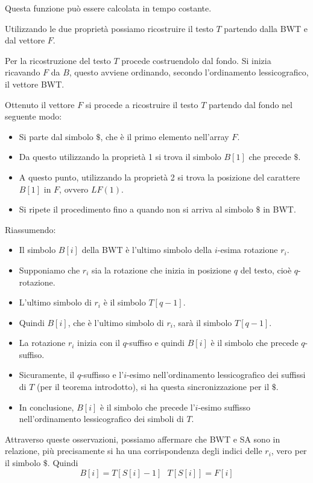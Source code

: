 Questa funzione può essere calcolata in tempo costante.

Utilizzando le due proprietà possiamo ricostruire il testo $T$ partendo dalla BWT e
dal vettore $F$.
\begin{esempio} 
    Per la ricostruzione del testo $T$ procede costruendolo dal fondo. Si inizia
    ricavando $F$ da $B$, questo avviene ordinando, secondo l'ordinamento lessicografico,
    il vettore BWT.

    Ottenuto il vettore $F$ si procede a ricostruire il testo $T$ partendo dal fondo
    nel seguente modo:
    \begin{itemize}
        \item Si parte dal simbolo $\$$, che è il primo elemento nell'array $F$.
        \item Da questo utilizzando la proprietà 1 si trova il simbolo $B[1]$ che
              precede $\$$.
        \item A questo punto, utilizzando la proprietà 2 si trova la posizione
              del carattere $B[1]$ in $F$, ovvero $LF(1)$.
        \item Si ripete il procedimento fino a quando non si arriva al simbolo $\$$ in BWT.
    \end{itemize}
\end{esempio}
Riassumendo:
\begin{itemize}
    \item Il simbolo $B[i]$ della BWT è l'ultimo simbolo della $i$-esima rotazione
          $r_i$.
    \item Supponiamo che $r_i$ sia la rotazione che inizia in posizione $q$ del
          testo, cioè $q$-rotazione.
    \item L'ultimo simbolo di $r_i$ è il simbolo $T[q-1]$.
    \item Quindi $B[i]$, che è l'ultimo simbolo di $r_i$, sarà il simbolo $T[q-1]$.
    \item La rotazione $r_i$ inizia con il $q$-suffiso e quindi $B[i]$ è il simbolo
          che precede $q$-suffiso.
    \item Sicuramente, il $q$-suffisso e l'$i$-esimo nell'ordinamento lessicografico
          dei suffissi di $T$ (per il teorema introdotto), si ha questa sincronizzazione
          per il $\$$. %
    \item In conclusione, $B[i]$ è il simbolo che precede l'$i$-esimo suffisso
          nell'ordinamento lessicografico dei simboli di $T$.
\end{itemize}
Attraverso queste osservazioni, possiamo affermare che BWT e SA sono in relazione,
più precisamente si ha una corrispondenza degli indici delle $r_i$, vero per il
simbolo $\$$. Quindi
\begin{equation}
    B[i] = T[S[i]-1] \ \ \ T[S[i]] = F[i]
\end{equation}


